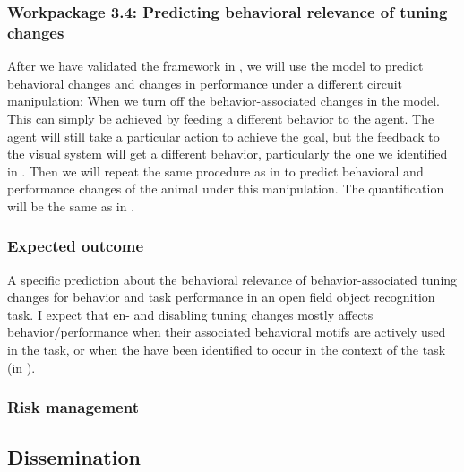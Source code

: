 \documentclass[B2,COG]{ercgrant}
\begin{document}
\subsubsection{Workpackage 3.4: Predicting behavioral relevance of tuning changes\hfill{}}

After we have validated the framework in , we will use the model to predict behavioral changes and changes in performance under a different circuit manipulation: When we turn off the behavior-associated changes in the model. 
This can simply be achieved by feeding a different behavior to the agent. 
The agent will still take a particular action to achieve the goal, but the feedback to the visual system will get a different behavior, particularly the one we identified in .
Then we will repeat the same procedure as in  to predict behavioral and performance changes of the animal under this manipulation. 
The quantification will be the same as in .

\subsubsection{Expected outcome} 
A specific prediction about the behavioral relevance of behavior-associated tuning changes for behavior and task performance in  an open field object recognition task. 
I expect that en- and disabling tuning changes mostly affects behavior/performance when their associated behavioral motifs are actively used in the task, or when the have been identified to occur in the context of the task (in ).

\subsubsection{Risk management} 

\subsection{Dissemination}
\end{document}
